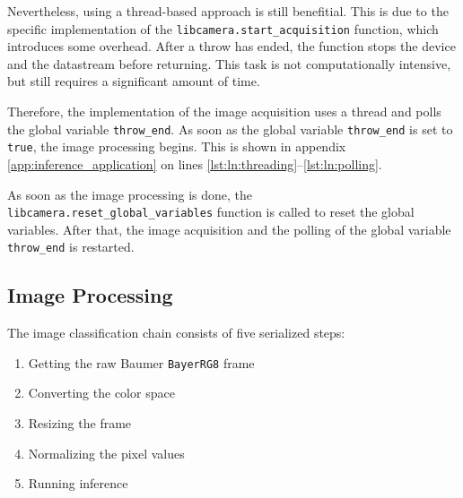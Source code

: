 Nevertheless, using a thread-based approach is still benefitial.
This is due to the specific implementation of the \texttt{libcamera.start\_acquisition} function, which introduces some overhead.
After a throw has ended, the function stops the device and the datastream before returning.
This task is not computationally intensive, but still requires a significant amount of time.

Therefore, the implementation of the image acquisition uses a thread and polls the global variable \texttt{throw\_end}.
As soon as the global variable \texttt{throw\_end} is set to \texttt{true}, the image processing begins.
This is shown in appendix \ref{app:inference_application} on lines \ref{lst:ln:threading}--\ref{lst:ln:polling}.

As soon as the image processing is done, the \texttt{libcamera.reset\_global\_variables} function is called to reset the global variables.
After that, the image acquisition and the polling of the global variable \texttt{throw\_end} is restarted.


\subsection{Image Processing}
\label{subsec:inference:app:image_processing}

The image classification chain consists of five serialized steps:
\begin{enumerate}
  \item Getting the raw Baumer \texttt{BayerRG8} frame
  \item Converting the color space
  \item Resizing the frame
  \item Normalizing the pixel values
  \item Running inference
\end{enumerate}

